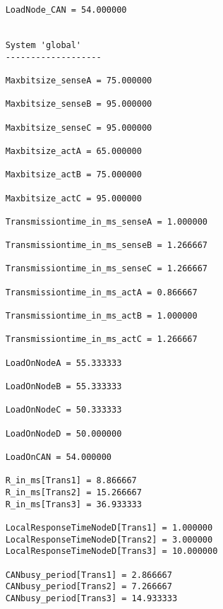 \begin{lstlisting}
	LoadNode_CAN = 54.000000
	
	
	System 'global'
	-------------------
	
	Maxbitsize_senseA = 75.000000
	
	Maxbitsize_senseB = 95.000000
	
	Maxbitsize_senseC = 95.000000
	
	Maxbitsize_actA = 65.000000
	
	Maxbitsize_actB = 75.000000
	
	Maxbitsize_actC = 95.000000
	
	Transmissiontime_in_ms_senseA = 1.000000
	
	Transmissiontime_in_ms_senseB = 1.266667
	
	Transmissiontime_in_ms_senseC = 1.266667
	
	Transmissiontime_in_ms_actA = 0.866667
	
	Transmissiontime_in_ms_actB = 1.000000
	
	Transmissiontime_in_ms_actC = 1.266667
	
	LoadOnNodeA = 55.333333
	
	LoadOnNodeB = 55.333333
	
	LoadOnNodeC = 50.333333
	
	LoadOnNodeD = 50.000000
	
	LoadOnCAN = 54.000000
	
	R_in_ms[Trans1] = 8.866667
	R_in_ms[Trans2] = 15.266667
	R_in_ms[Trans3] = 36.933333
	
	LocalResponseTimeNodeD[Trans1] = 1.000000
	LocalResponseTimeNodeD[Trans2] = 3.000000
	LocalResponseTimeNodeD[Trans3] = 10.000000
	
	CANbusy_period[Trans1] = 2.866667
	CANbusy_period[Trans2] = 7.266667
	CANbusy_period[Trans3] = 14.933333
	
\end{lstlisting}